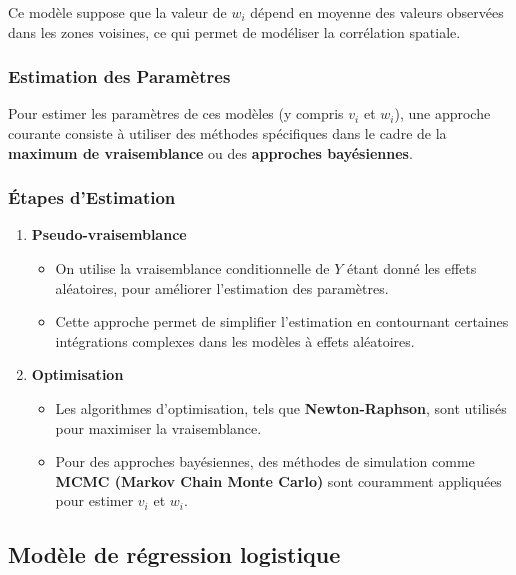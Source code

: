 \documentclass[
]{article}
\providecommand{\tightlist}{%
  \setlength{\itemsep}{0pt}\setlength{\parskip}{0pt}}
\begin{document}
Ce modèle suppose que la valeur de \(w_i\) dépend en moyenne des valeurs
observées dans les zones voisines, ce qui permet de modéliser la
corrélation spatiale.

\subsubsection{Estimation des
Paramètres}\label{estimation-des-paramuxe8tres}

Pour estimer les paramètres de ces modèles (y compris \(v_i\) et
\(w_i\)), une approche courante consiste à utiliser des méthodes
spécifiques dans le cadre de la \textbf{maximum de vraisemblance} ou des
\textbf{approches bayésiennes}.

\subsubsection{Étapes d'Estimation}\label{uxe9tapes-destimation}

\begin{enumerate}
\def\labelenumi{\arabic{enumi}.}
\tightlist
\item
  \textbf{Pseudo-vraisemblance}

  \begin{itemize}
  \tightlist
  \item
    On utilise la vraisemblance conditionnelle de \(Y\) étant donné les
    effets aléatoires, pour améliorer l'estimation des paramètres.
  \item
    Cette approche permet de simplifier l'estimation en contournant
    certaines intégrations complexes dans les modèles à effets
    aléatoires.
  \end{itemize}
\item
  \textbf{Optimisation}

  \begin{itemize}
  \tightlist
  \item
    Les algorithmes d'optimisation, tels que \textbf{Newton-Raphson},
    sont utilisés pour maximiser la vraisemblance.
  \item
    Pour des approches bayésiennes, des méthodes de simulation comme
    \textbf{MCMC (Markov Chain Monte Carlo)} sont couramment appliquées
    pour estimer \(v_i\) et \(w_i\).
  \end{itemize}
\end{enumerate}

\subsection{Modèle de régression
logistique}\label{moduxe8le-de-ruxe9gression-logistique}
\end{document}
